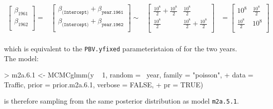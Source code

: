 \documentclass{article}
\begin{document}
\begin{equation}
\begin{array}{rccl}
\left[
\begin{array}{c}
 \beta_{1961}\\
 \beta_{1962}\\
\end{array}
\right]
=
&
\left[
\begin{array}{c}
 \beta_{\texttt{(Intercept)}}+\beta_{\texttt{year.1961}}\\
 \beta_{\texttt{(Intercept)}}+\beta_{\texttt{year.1962}}\\
\end{array}
\right]
\sim
&
\left[
\begin{array}{cc}
\frac{10^{8}}{2}+\frac{10^{8}}{2}&\frac{10^{8}}{2}\\
\frac{10^{8}}{2}&\frac{10^{8}}{2}+\frac{10^{8}}{2}\\
\end{array}
\right]
&=
\left[
\begin{array}{cc}
10^8&\frac{10^{8}}{2}\\
\frac{10^{8}}{2}&10^8\\
\end{array}
\right]
\\
\end{array}
\end{equation}

which is equivalent to the \texttt{PBV.yfixed} parameteristaion of for the two years.\\

The model:

\begin{Schunk}
\begin{Sinput}
> m2a.6.1 <- MCMCglmm(y ~ 1, random = ~year, family = "poisson", 
+     data = Traffic, prior = prior.m2a.6.1, verbose = FALSE, 
+     pr = TRUE)
\end{Sinput}
\end{Schunk}

is therefore sampling from the same posterior distribution as model \texttt{m2a.5.1}.
\ifalone
\end{document}
